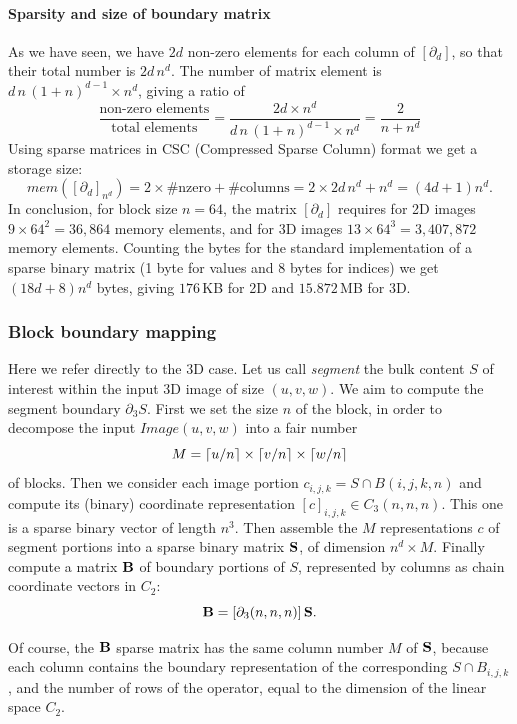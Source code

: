 \paragraph{Sparsity and size of boundary matrix }\label{sec:bbbb} 

As we have seen, we have $2d$ non-zero elements for each column of $[\partial_d]$, so that their total number is $2d\,n^d$. The number of matrix element is $d\,n\,(1+n)^{d-1} \times n^d$, giving a ratio of 
\[
\frac{\mbox{non-zero\ elements}}{\mbox{total\ elements}} = 
\frac{2d\times n^d}{d\,n\,(1+n)^{d-1} \times n^d} =
\frac{2}{n+n^d}
\]
Using sparse matrices in CSC (Compressed Sparse Column) format we get a storage size:
\[
mem([\partial_d]_{n^d}) = 2\times \#\mbox{nzero} + \#\mbox{columns} = 2\times 2d\,n^d + n^d = (4d+1)n^d.
\]
In conclusion, for block size $n=64$, the matrix $[\partial_d]$ requires for 2D images $9\times 64^2=36,864$ memory elements, and for 3D images $13\times 64^3=3,407,872$ memory elements. Counting the bytes for the standard implementation of a sparse binary matrix (1 byte for values and 8 bytes for indices) we get $(18d+8)n^d$ bytes, giving $176$\,KB for 2D and $15.872$\,MB for 3D.

\subsubsection{Block boundary mapping}\label{sec:bbbb}

Here we refer directly to the 3D case.
Let us call \emph{segment} the bulk content $S$ of interest within the input 3D image of size $(u,v,w)$. We aim to compute the segment boundary $\partial_3 S$. 
First we set the size $n$ of the block, in order to decompose the input $Image(u,v,w)$ into a fair number 
\[
M = \left\lceil u/n \right\rceil \times \left\lceil v/n \right\rceil \times \left\lceil w/n \right\rceil
\] of blocks. 
Then we consider each image portion $c_{i,j,k} = S\cap B(i,j,k,n)$ and compute its (binary) coordinate representation  $[c]_{i,j,k}\in C_3(n,n,n)$. This one is a sparse binary vector of length $n^3$. Then assemble the $M$ representations $c$ of segment portions into a sparse binary matrix ${\bf S}$, of dimension $n^d \times M$. Finally compute a matrix ${\bf B}$ of boundary portions of $S$, represented by columns as chain coordinate vectors in $C_2$:
\[
{\bf B} = [\partial_3(n,n,n)]\, {\bf S}.
\]

Of course, the ${\bf B}$ sparse matrix has the same column number $M$ of ${\bf S}$, because each column contains the boundary representation of the corresponding $S\cap B_{i,j,k}$, and the number of rows of the operator, equal to the dimension of the linear space $C_2$.

